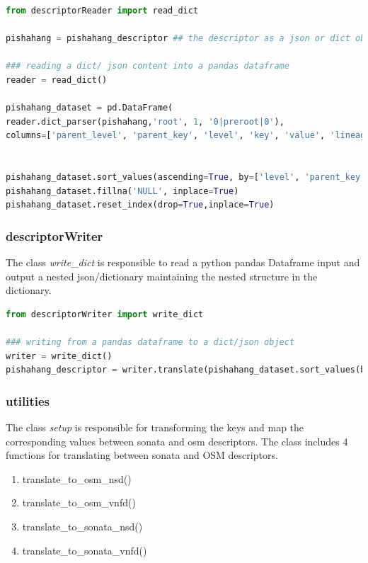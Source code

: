 \begin{lstlisting}[language=Python,caption=reader to read a json into a DataFrame, label=lis:descriptorReader]
from descriptorReader import read_dict

pishahang = pishahang_descriptor ## the descriptor as a json or dict object

### reading a dict/ json content into a pandas dataframe
reader = read_dict()

pishahang_dataset = pd.DataFrame(
reader.dict_parser(pishahang,'root', 1, '0|preroot|0'), 
columns=['parent_level', 'parent_key', 'level', 'key', 'value', 'lineage'])


pishahang_dataset.sort_values(ascending=True, by=['level', 'parent_key'],inplace=True)
pishahang_dataset.fillna('NULL', inplace=True)
pishahang_dataset.reset_index(drop=True,inplace=True)

\end{lstlisting}
\subsubsection{descriptorWriter}

The class \textit{write\_dict} is responsible to read a python pandas Dataframe input and output a nested json/dictionary maintaining the nested structure in the dictionary.

\begin{lstlisting}[language=Python,caption=writer to write a translated DataFrame into a json, label=lis:descriptorWriter]
from descriptorWriter import write_dict

### writing from a pandas dataframe to a dict/json object
writer = write_dict()
pishahang_descriptor = writer.translate(pishahang_dataset.sort_values(by='lineage'))

\end{lstlisting}

\subsubsection{utilities}

The class \textit{setup} is responsible for transforming the keys and map the corresponding values between sonata and osm descriptors. The class includes 4 functions for translating between sonata and OSM descriptors. 
\begin{enumerate}
	\item translate\_to\_osm\_nsd()
	\item translate\_to\_osm\_vnfd()
	\item translate\_to\_sonata\_nsd()
	\item translate\_to\_sonata\_vnfd()
\end{enumerate}

